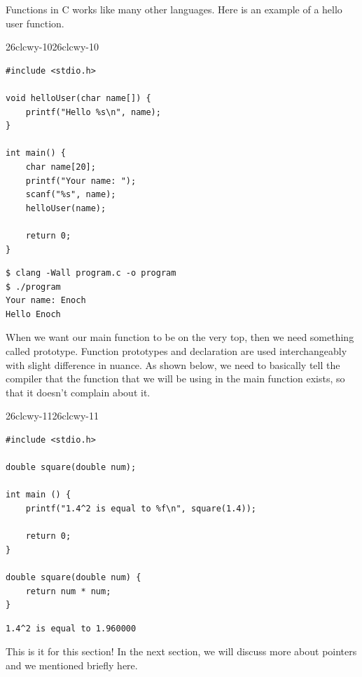 \documentclass[../../../main.tex]{subfiles}
\begin{document}
Functions in C works like many other languages. Here is an example
of a hello user function.

\begin{cbox}{26clcwy-10}{26clcwy-10}
\begin{lstlisting}[style=cstyle]
#include <stdio.h>

void helloUser(char name[]) {
    printf("Hello %s\n", name);
}

int main() {
    char name[20];
    printf("Your name: ");
    scanf("%s", name);
    helloUser(name);

    return 0;
}
\end{lstlisting}
\end{cbox}
\begin{outputbox}
\begin{lstlisting}[style=basic]
$ clang -Wall program.c -o program
$ ./program
Your name: Enoch
Hello Enoch
\end{lstlisting}
\end{outputbox}

When we want our main function to be on the very top, then we need
something called prototype. Function prototypes and declaration are
used interchangeably with slight difference in nuance. As shown below,
we need to basically tell the compiler that the function that we will
be using in the main function exists, so that it doesn't complain
about it.

\begin{cbox}{26clcwy-11}{26clcwy-11}
\begin{lstlisting}[style=cstyle]
#include <stdio.h>

double square(double num);

int main () {
    printf("1.4^2 is equal to %f\n", square(1.4));

    return 0;
}

double square(double num) {
    return num * num;
}
\end{lstlisting}
\end{cbox}
\begin{outputbox}
\begin{lstlisting}[style=basic]
1.4^2 is equal to 1.960000
\end{lstlisting}
\end{outputbox}

This is it for this section! In the next section, we will discuss
more about pointers and we mentioned briefly here.
\end{document}

